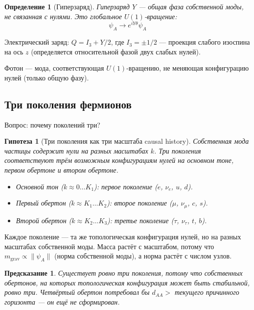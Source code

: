 \documentclass[12pt,a4paper]{article}
\newtheorem{definition}{Определение}[section]
\newtheorem{hypothesis}{Гипотеза}[section]
\newtheorem{prediction}{Предсказание}[section]
\begin{document}
\begin{definition}[Гиперзаряд]
Гиперзаряд $Y$ — общая фаза собственной моды, не связанная с нулями. Это глобальное $U(1)$-вращение:
\begin{equation}
    \psi_A \to e^{iY\theta} \psi_A
\end{equation}
\end{definition}

Электрический заряд: $Q = I_3 + Y/2$, где $I_3 = \pm 1/2$ — проекция слабого изоспина на ось $z$ (определяется относительной фазой двух слабых нулей).

Фотон — мода, соответствующая $U(1)$-вращению, не меняющая конфигурацию нулей (только общую фазу).

\subsection{Три поколения фермионов}

Вопрос: почему поколений три?

\begin{hypothesis}[Три поколения как три масштаба causal history]
Собственная мода частицы содержит нули на разных масштабах $k$. Три поколения соответствуют трём возможным конфигурациям нулей на основном тоне, первом обертоне и втором обертоне.
\begin{itemize}
    \item Основной тон ($k \approx 0 \dots K_1$): первое поколение ($e$, $\nu_e$, $u$, $d$).
    \item Первый обертон ($k \approx K_1 \dots K_2$): второе поколение ($\mu$, $\nu_\mu$, $c$, $s$).
    \item Второй обертон ($k \approx K_2 \dots K_3$): третье поколение ($\tau$, $\nu_\tau$, $t$, $b$).
\end{itemize}
\end{hypothesis}

Каждое поколение — та же топологическая конфигурация нулей, но на разных масштабах собственной моды. Масса растёт с масштабом, потому что $m_{\text{grav}} \propto \|\psi_A\|$ (норма собственной моды), а норма растёт с числом узлов.

\begin{prediction}
Существует ровно три поколения, потому что собственных обертонов, на которых топологическая конфигурация может быть стабильной, ровно три. Четвёртый обертон потребовал бы $d_{AA} >$ текущего причинного горизонта — он ещё не сформирован.
\end{prediction}
\end{document}
